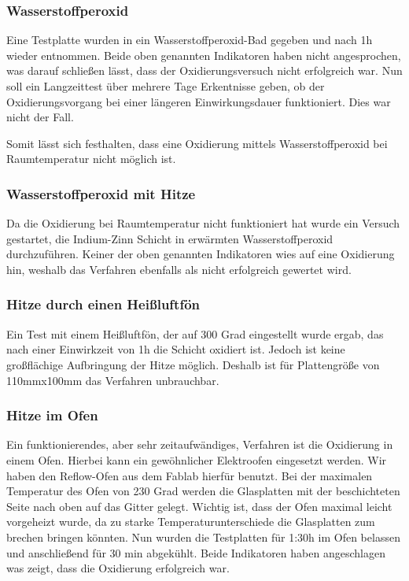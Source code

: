 \subsubsection{Wasserstoffperoxid}


Eine Testplatte wurden in ein Wasserstoffperoxid-Bad gegeben und nach 1h wieder entnommen. Beide oben genannten Indikatoren haben nicht angesprochen, was darauf schließen lässt, dass der Oxidierungsversuch nicht erfolgreich war.
Nun soll ein Langzeittest über mehrere Tage Erkentnisse geben, ob der Oxidierungsvorgang bei einer längeren Einwirkungsdauer funktioniert. Dies war nicht der Fall.

Somit lässt sich festhalten, dass eine Oxidierung mittels Wasserstoffperoxid bei Raumtemperatur nicht möglich ist.

\subsubsection{Wasserstoffperoxid mit Hitze}

Da die Oxidierung bei Raumtemperatur nicht funktioniert hat wurde ein Versuch gestartet, die Indium-Zinn Schicht in erwärmten Wasserstoffperoxid durchzuführen.
Keiner der oben genannten Indikatoren wies auf eine Oxidierung hin, weshalb das Verfahren ebenfalls als nicht erfolgreich gewertet wird.

\subsubsection{Hitze durch einen Heißluftfön}

Ein Test mit einem Heißluftfön, der auf 300 Grad eingestellt wurde ergab, das nach einer Einwirkzeit von 1h die Schicht oxidiert ist. Jedoch ist keine großflächige Aufbringung der Hitze möglich. Deshalb ist für Plattengröße von 110mmx100mm das Verfahren unbrauchbar.

\subsubsection{Hitze im Ofen}

Ein funktionierendes, aber sehr zeitaufwändiges, Verfahren ist die Oxidierung in einem Ofen. Hierbei kann ein gewöhnlicher Elektroofen eingesetzt werden. Wir haben den Reflow-Ofen aus dem Fablab hierfür benutzt.
Bei der maximalen Temperatur des Ofen von 230 Grad werden die Glasplatten mit der beschichteten Seite nach oben auf das Gitter gelegt. Wichtig ist, dass der Ofen maximal leicht vorgeheizt wurde, da zu starke Temperaturunterschiede die Glasplatten zum brechen bringen könnten. Nun wurden die Testplatten für 1:30h im Ofen belassen und anschließend für 30 min abgekühlt.
Beide Indikatoren haben angeschlagen was zeigt, dass die Oxidierung erfolgreich war.\\

